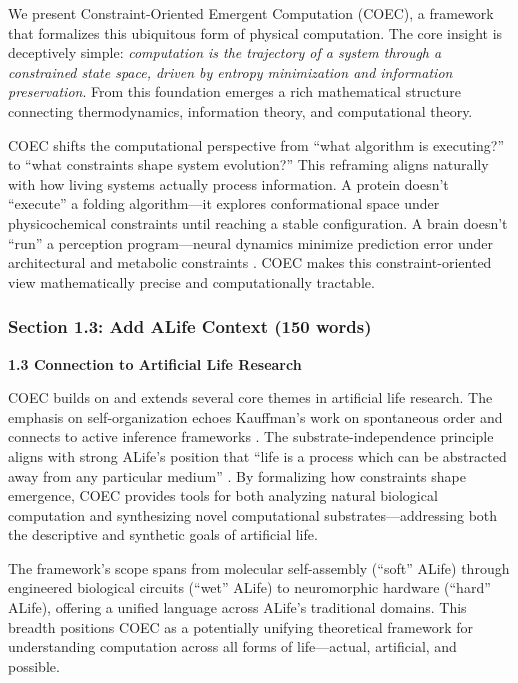 \documentclass[11pt]{article}
\begin{document}
\begin{tcolorbox}[colback=add!10,colframe=add]
We present Constraint-Oriented Emergent Computation (COEC), a framework that formalizes this ubiquitous form of physical computation. The core insight is deceptively simple: \textit{computation is the trajectory of a system through a constrained state space, driven by entropy minimization and information preservation}. From this foundation emerges a rich mathematical structure connecting thermodynamics, information theory, and computational theory.

COEC shifts the computational perspective from ``what algorithm is executing?'' to ``what constraints shape system evolution?'' This reframing aligns naturally with how living systems actually process information. A protein doesn't ``execute'' a folding algorithm—it explores conformational space under physicochemical constraints until reaching a stable configuration. A brain doesn't ``run'' a perception program—neural dynamics minimize prediction error under architectural and metabolic constraints \cite{friston2010free}. COEC makes this constraint-oriented view mathematically precise and computationally tractable.
\end{tcolorbox}

\subsubsection{Section 1.3: Add ALife Context (150 words)}

\begin{tcolorbox}[colback=add!10,colframe=add,title=ADD This New Subsection]
\textbf{1.3 Connection to Artificial Life Research}

COEC builds on and extends several core themes in artificial life research. The emphasis on self-organization echoes Kauffman's work on spontaneous order \cite{kauffman1993origins} and connects to active inference frameworks \cite{friston2010free}. The substrate-independence principle aligns with strong ALife's position that ``life is a process which can be abstracted away from any particular medium'' \cite{langton1989artificial}. By formalizing how constraints shape emergence, COEC provides tools for both analyzing natural biological computation and synthesizing novel computational substrates—addressing both the descriptive and synthetic goals of artificial life.

The framework's scope spans from molecular self-assembly (``soft'' ALife) through engineered biological circuits (``wet'' ALife) to neuromorphic hardware (``hard'' ALife), offering a unified language across ALife's traditional domains. This breadth positions COEC as a potentially unifying theoretical framework for understanding computation across all forms of life—actual, artificial, and possible.
\end{tcolorbox}
\end{document}
